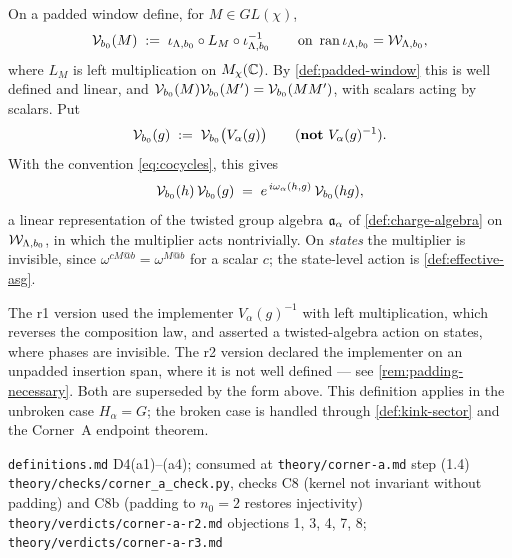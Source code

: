 \begin{definition}
\label{def:bond-implementer}
On a padded window define, for $M \in GL(\chi)$,
\begin{equation}
  \mathcal{V}_{b_{0}}(M) \; := \;
  \iota_{\Lambda,b_{0}} \circ L_{M} \circ \iota_{\Lambda,b_{0}}^{-1}
  \qquad \text{on } \operatorname{ran} \iota_{\Lambda,b_{0}} = \mathcal{W}_{\Lambda,b_{0}},
\end{equation}
where $L_{M}$ is left multiplication on $M_{\chi}(\mathbb{C})$. By
\cref{def:padded-window} this is well defined and linear, and
$\mathcal{V}_{b_{0}}(M)\mathcal{V}_{b_{0}}(M') = \mathcal{V}_{b_{0}}(MM')$, with scalars
acting by scalars. Put
\begin{equation}
  \mathcal{V}_{b_{0}}(g) \; := \; \mathcal{V}_{b_{0}}\bigl(V_{\alpha}(g)\bigr)
  \qquad \text{(\textbf{not} } V_{\alpha}(g)^{-1} \text{)} .
\end{equation}
With the convention \eqref{eq:cocycles}, this gives
\begin{equation}
  \mathcal{V}_{b_{0}}(h) \, \mathcal{V}_{b_{0}}(g)
  \;=\; e^{\,i \omega_{\alpha}(h,g)} \, \mathcal{V}_{b_{0}}(hg) ,
  \label{eq:implementer-cocycle}
\end{equation}
a linear representation of the twisted group algebra $\mathfrak{a}_{\alpha}$ of
\cref{def:charge-algebra} on $\mathcal{W}_{\Lambda,b_{0}}$, in which the multiplier
acts nontrivially. On \emph{states} the multiplier is invisible, since
$\omega^{cM@b} = \omega^{M@b}$ for a scalar $c$; the state-level action is
\cref{def:effective-asg}.
\end{definition}

\begin{remark}
The r1 version used the implementer $V_{\alpha}(g)^{-1}$ with left
multiplication, which reverses the composition law, and asserted a
twisted-algebra action on states, where phases are invisible. The r2 version
declared the implementer on an unpadded insertion span, where it is not well
defined --- see \cref{rem:padding-necessary}. Both are superseded by the form
above. This definition applies in the unbroken case $H_{\alpha} = G$; the
broken case is handled through \cref{def:kink-sector} and the Corner~A
endpoint theorem.
\end{remark}

%
{\texttt{definitions.md} D4(a1)--(a4); consumed at \texttt{theory/corner-a.md}
 step (1.4)}%
{\texttt{theory/checks/corner\_a\_check.py}, checks C8 (kernel not invariant
 without padding) and C8b (padding to $n_{0}=2$ restores injectivity)}%
{\texttt{theory/verdicts/corner-a-r2.md} objections 1, 3, 4, 7, 8;
 \texttt{theory/verdicts/corner-a-r3.md}}

